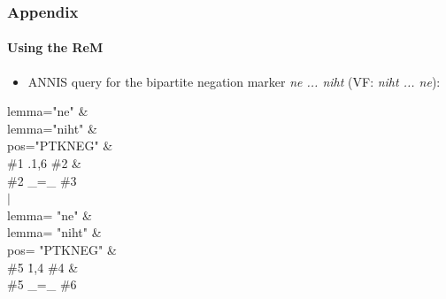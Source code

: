 \documentclass[xcolor=table, compress, %
handout
]{beamer}
\begin{document}
\begin{frame}
\frametitle{Appendix}
\framesubtitle{Using the ReM}
    
    \begin{itemize}
    \item ANNIS query for the bipartite negation marker \textit{ne ... niht} (VF: \textit{niht ... ne}):
    \end{itemize}
    \vspace{-1cm}
\begin{center}
\begin{box}
lemma="ne" \&\\
lemma="niht" \&\\
pos="PTKNEG" \&\\
\#1 .1,6 \#2 \&\\
\#2 \_=\_ \#3\\ 
$|$\\
lemma= "ne" \&\\
lemma= "niht" \&\\
pos= "PTKNEG" \&\\
\#5 \.1,4 \#4 \&\\
\#5 \_=\_ \#6\\ 

\end{box}
\end{center}
    
\end{frame}
\end{document}
